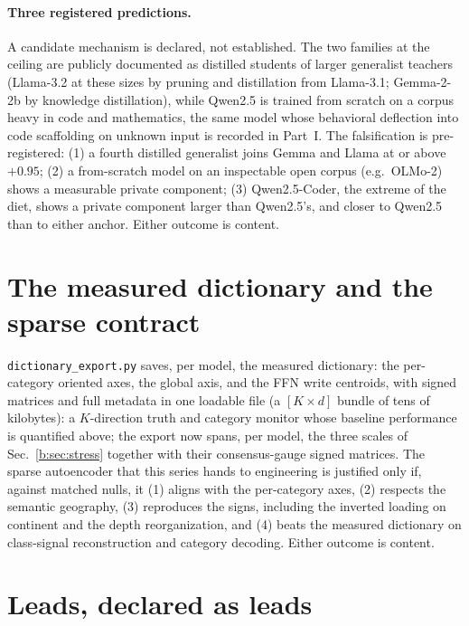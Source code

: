 \documentclass[11pt]{article}
\begin{document}
\paragraph{Three registered predictions.} A candidate mechanism is
declared, not established. The two families at the ceiling are publicly
documented as distilled students of larger generalist teachers (Llama-3.2
at these sizes by pruning and distillation from Llama-3.1; Gemma-2-2b by
knowledge distillation), while Qwen2.5 is trained from scratch on a
corpus heavy in code and mathematics, the same model whose behavioral
deflection into code scaffolding on unknown input is recorded in
Part~I. The falsification is pre-registered: (1) a fourth distilled
generalist joins Gemma and Llama at or above $+0.95$; (2) a from-scratch
model on an inspectable open corpus (e.g.\ OLMo-2) shows a measurable
private component; (3) Qwen2.5-Coder, the extreme of the diet, shows a
private component larger than Qwen2.5's, and closer to Qwen2.5 than to
either anchor. Either outcome is content.

\section{The measured dictionary and the sparse contract}
\label{b:sec:contract}

\texttt{dictionary\_export.py} saves, per model, the measured dictionary:
the per-category oriented axes, the global axis, and the FFN write
centroids, with signed matrices and full metadata in one loadable file (a
$[K \times d]$ bundle of tens of kilobytes): a $K$-direction truth and
category monitor whose baseline performance is quantified above; the export now spans,
per model, the three scales of Sec.~\ref{b:sec:stress} together with
their consensus-gauge signed matrices. The
sparse autoencoder that this series hands to engineering is justified only
if, against matched nulls, it (1) aligns with the per-category axes, (2)
respects the semantic geography, (3) reproduces the signs, including the
inverted loading on continent and the depth reorganization, and (4) beats
the measured dictionary on class-signal reconstruction and category
decoding. Either outcome is content.

\section{Leads, declared as leads}
\label{b:sec:leads}
\end{document}
